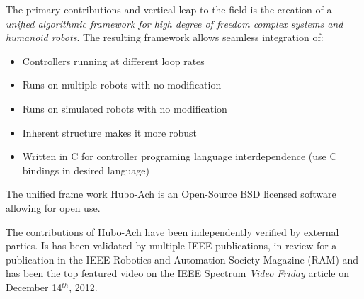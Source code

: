 The primary contributions and vertical leap to the field is the creation of a \textit{unified algorithmic framework for high degree of freedom complex systems and humanoid robots}.
The resulting framework allows seamless integration of:
\begin{itemize}
\item Controllers running at different loop rates
\item Runs on multiple robots with no modification
\item Runs on simulated robots with no modification 
\item Inherent structure makes it more robust
\item Written in C for controller programing language interdependence (use C bindings in desired language)
\end{itemize}
The unified frame work Hubo-Ach is an Open-Source BSD licensed software allowing for open use.

The contributions of Hubo-Ach have been independently verified by external parties\cite{tepraDoor2013,tepraCut2013}.
Is has been validated by multiple IEEE publications\cite{lofaroTePRA2013HuboAch,lofaroTePRA2013Valve}, in review for a publication in the IEEE Robotics and Automation Society Magazine (RAM)\cite{lofaroRAM2013} and has been the top featured video on the IEEE Spectrum \textit{Video Friday} article on December 14$^{th}$, 2012\cite{videoFriday}.
